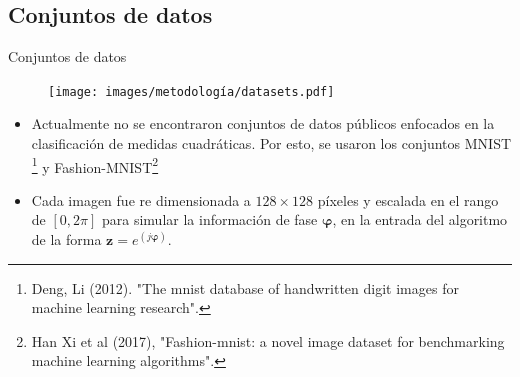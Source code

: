 \documentclass[aspectratio=169,t,xcolor=table]{beamer}
\begin{document}
\subsection{Conjuntos de datos}
\begin{frame}{Conjuntos de datos}
    \scriptsize
    \begin{figure}
        \centering
        \texttt{[image: images/metodología/datasets.pdf]}
        \label{fig:my_label}
    \end{figure}
    \begin{table}[!h]
    \renewcommand*{\arraystretch}{1.1}
    \centering{}
    \label{tab:conjunto_datos}
    \end{table}
    \begin{itemize}
        \item Actualmente no se encontraron conjuntos de datos públicos enfocados en la clasificación de medidas cuadráticas. Por esto, se usaron los conjuntos MNIST \footnote{\tiny Deng, Li (2012). "The mnist database of handwritten digit images for machine learning research".} y Fashion-MNIST\footnote{\tiny Han Xi et al (2017), "Fashion-mnist: a novel image dataset for benchmarking machine learning algorithms".}
        \item Cada imagen fue re dimensionada a $128 \times 128$ píxeles y escalada en el rango de $[0, 2\pi]$ para simular la información de fase $\boldsymbol{\varphi}$, en la entrada del algoritmo de la forma $\mathbf{z} = e^{(j \boldsymbol{\varphi})}$.
    \end{itemize}
\end{frame}
\end{document}
